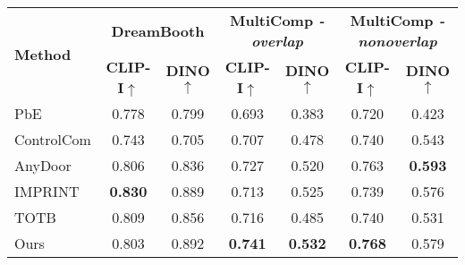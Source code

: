 \begin{table}[t!]
\centering
\begin{adjustbox}{width=\linewidth}
\begin{tabular}{lcccccc}
\toprule
\multirow{2}[3]{*}{\textbf{Method}} & \multicolumn{2}{c}{\textbf{DreamBooth}} & \multicolumn{2}{c}{\textbf{MultiComp \textit{-overlap}}} & \multicolumn{2}{c}{\textbf{MultiComp \textit{-nonoverlap}}} \\
\cmidrule(lr){2-3} \cmidrule(lr){4-5} \cmidrule(lr){6-7}  & \textbf{CLIP-I$\uparrow$} & \textbf{DINO$\uparrow$} &  \textbf{CLIP-I$\uparrow$} & \textbf{DINO$\uparrow$} & \textbf{CLIP-I$\uparrow$} & \textbf{DINO$\uparrow$}\\ 
\cmidrule{1-7}
PbE \cite{yang2023paintbyexample}                                                                                                          &      0.778                   &  0.799             &        0.693             &   0.383  &     0.720 & 0.423                \\
\cmidrule{1-7}
ControlCom \cite{zhang2023controlcom}                                                                                          &      0.743          &  0.705 &          0.707                                                                 &                  0.478    &          0.740     &    0.543   \\ 
\cmidrule{1-7}
AnyDoor \cite{chen2023anydoor}                                                                                        &       0.806          & 0.836 &  0.727                                                               &       0.520          &   0.763    &               \textbf{0.593}         \\ 
\cmidrule{1-7}
IMPRINT \cite{song2024imprint}                                                                                                           &      \textbf{0.830}                   &  0.889   &           0.713                                                                                                         &        0.525             &  0.739   &      0.576                \\
\cmidrule{1-7}
TOTB \cite{tarres2024thinking}                                                                                            &    0.809      &  0.856   &      0.716    &                                                          0.485             &       0.740             &   0.531              \\ 
\cmidrule{1-7}
Ours                                                                                           &    0.803     &  0.892   &      \textbf{0.741}     &                                                              \textbf{0.532}             &   \textbf{0.768}            &   0.579              \\ 

\end{tabular}
\end{adjustbox}
\end{table}
